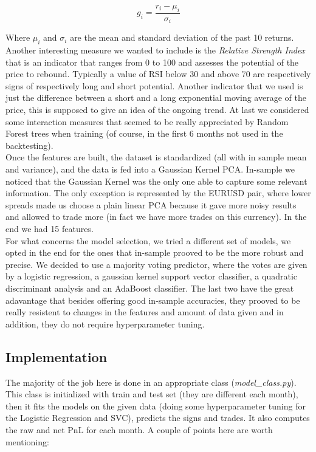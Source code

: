 \documentclass[a4paper]{article}
\begin{document}
$$
g_i = \frac{r_i - \mu_i}{\sigma_i}
$$

Where $\mu_i$ and $\sigma_i$ are the mean and standard deviation of the past 10 returns. Another interesting measure we wanted to include is the \textit{Relative Strength Index} that is an indicator that ranges from 0 to 100 and assesses the potential of the price to rebound. Typically a value of RSI below 30 and above 70 are respectively signs of respectively long and short potential. Another indicator that we used is just the difference between a short and a long exponential moving average of the price, this is supposed to give an idea of the ongoing trend. At last we considered some interaction measures that seemed to be really appreciated by Random Forest trees when training (of course, in the first 6 months not used in the backtesting).\\
Once the features are built, the dataset is standardized (all with in sample mean and variance), and the data is fed into a Gaussian Kernel PCA. In-sample we noticed that the Gaussian Kernel was the only one able to capture some relevant information. The only exception is represented by the EURUSD pair, where lower spreads made us choose a plain linear PCA because it gave more noisy results and allowed to trade more (in fact we have more trades on this currency). In the end we had 15 features.\\
For what concerns the model selection, we tried a different set of models, we opted in the end for the ones that in-sample prooved to be the more robust and precise. We decided to use a majority voting predictor, where the votes are given by a logistic regression, a gaussian kernel support vector classifier, a quadratic discriminant analysis and an AdaBoost classifier. The last two have the great adavantage that besides offering good in-sample accuracies, they prooved to be really resistent to changes in the features and amount of data given and in addition, they do not require hyperparameter tuning.\\ 

\subsection{Implementation}

The majority of the job here is done in an appropriate class (\textit{model\_class.py}).
This class is initialized with train and test set (they are different each month), then it fits the models on the given data (doing some hyperparameter tuning for the Logistic Regression and SVC), predicts the signs and trades. It also computes the raw and net PnL for each month. A couple of points here are worth mentioning:
\end{document}
